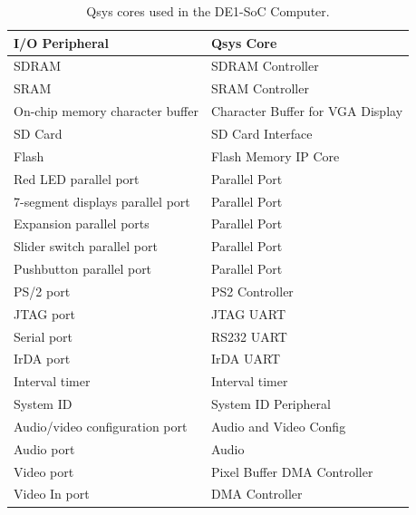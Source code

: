 \documentclass[11pt, twoside, pdftex]{article}
\newcommand{\commonFiles}{../../../common/doc}
\newcommand{\systemName}{DE1-SoC Computer}
\begin{document}

\begin{table}[h]
    \begin{center}
    \begin{tabular}{l|l}
            \textbf{I/O Peripheral}
            & \textbf{Qsys Core}
        \\\hline
            SDRAM
            & SDRAM Controller
        \\
            SRAM
        &   SRAM Controller
        \\
            On-chip memory character buffer
				& Character Buffer for VGA Display
        \\
            SD Card
        &   SD Card Interface
        \\
            Flash
        &   Flash Memory IP Core
        \\
            Red LED parallel port
				& Parallel Port
        \\
            7-segment displays parallel port
				& Parallel Port
        \\
            Expansion parallel ports
				& Parallel Port
        \\
            Slider switch parallel port
				& Parallel Port
        \\
            Pushbutton parallel port
				& Parallel Port
        \\
            PS/2 port
				& PS2 Controller
        \\
            JTAG port
				& JTAG UART
        \\
            Serial port
				& RS232 UART
        \\
            IrDA port
				& IrDA UART
        \\
            Interval timer
				& Interval timer 
        \\
            System ID
				& System ID Peripheral
        \\
            Audio/video configuration port
				& Audio and Video Config
        \\
            Audio port
				& Audio
        \\
            Video port
				& Pixel Buffer DMA Controller
        \\
            Video In port
				& DMA Controller
        \\
    \end{tabular}
    \caption{Qsys cores used in the \systemName.}
    \label{tab:sopcnames}
    \end{center}
\end{table}
\clearpage
\end{document}
